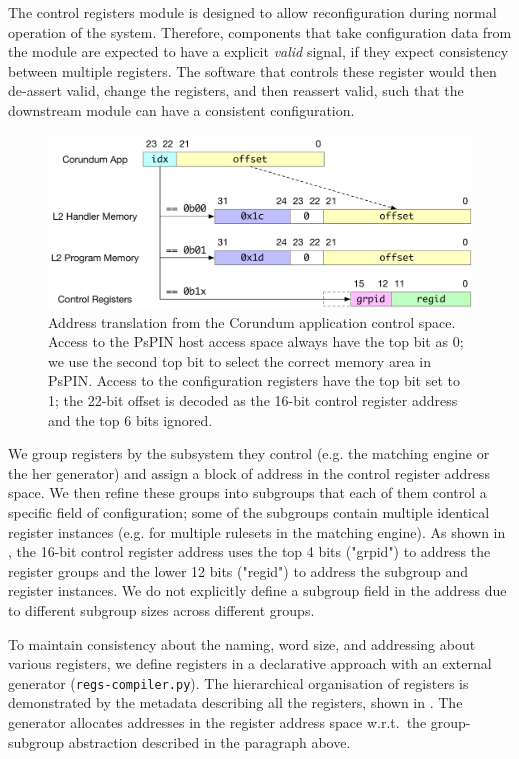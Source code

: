 The control registers module is designed to allow reconfiguration during normal operation of the system.  Therefore, components that take configuration data from the module are expected to have a explicit \emph{valid} signal, if they expect consistency between multiple registers.  The software that controls these register would then de-assert valid, change the registers, and then reassert valid, such that the downstream module can have a consistent configuration.

\begin{figure}
    \centering
    \includegraphics[width=.8\textwidth]{thesis/figures/corundum-pspin-addr.pdf}
    \caption{Address translation from the Corundum application control space.  Access to the PsPIN host access space always have the top bit as 0; we use the second top bit to select the correct memory area in PsPIN.  Access to the configuration registers have the top bit set to 1; the 22-bit offset is decoded as the 16-bit control register address and the top 6 bits ignored.} \label{fig:hw-addr-map}
\end{figure}

We group registers by the subsystem they control (e.g. the matching engine or the \ac{her} generator) and assign a block of address in the control register address space.  We then refine these groups into subgroups that each of them control a specific field of configuration; some of the subgroups contain multiple identical register instances (e.g. for multiple rulesets in the matching engine).  As shown in , the 16-bit control register address uses the top 4 bits ("grpid") to address the register groups and the lower 12 bits ("regid") to address the subgroup and register instances.  We do not explicitly define a subgroup field in the address due to different subgroup sizes across different groups.

To maintain consistency about the naming, word size, and addressing about various registers, we define registers in a declarative approach with an external generator (\texttt{regs-compiler.py}).  The hierarchical organisation of registers is demonstrated by the metadata describing all the registers, shown in .  The generator allocates addresses in the register address space w.r.t.\ the group-subgroup abstraction described in the paragraph above.

